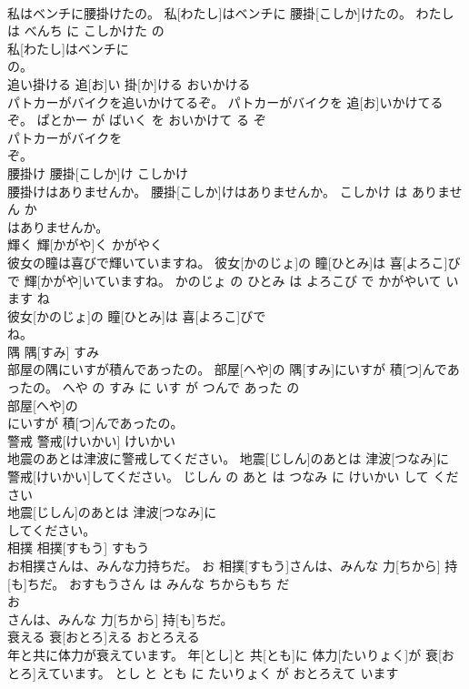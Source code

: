 \documentclass[8pt]{extreport}
\begin{document}
\begin{CJK}{UTF8}{min}
\\	私はベンチに腰掛けたの。	私[わたし]はベンチに 腰掛[こしか]けたの。	わたし は べんち に こしかけた の	
\\	私[わたし]はベンチに
\\	の。			
\\	追い掛ける	追[お]い 掛[か]ける	おいかける	
\\	パトカーがバイクを追いかけてるぞ。	パトカーがバイクを 追[お]いかけてるぞ。	ぱとかー が ばいく を おいかけて る ぞ	
\\	パトカーがバイクを
\\	ぞ。			
\\	腰掛け	腰掛[こしか]け	こしかけ	
\\	腰掛けはありませんか。	腰掛[こしか]けはありませんか。	こしかけ は ありません か	
\\	はありませんか。			
\\	輝く	輝[かがや]く	かがやく	
\\	彼女の瞳は喜びで輝いていますね。	彼女[かのじょ]の 瞳[ひとみ]は 喜[よろこ]びで 輝[かがや]いていますね。	かのじょ の ひとみ は よろこび で かがやいて います ね	
\\	彼女[かのじょ]の 瞳[ひとみ]は 喜[よろこ]びで
\\	ね。			
\\	隅	隅[すみ]	すみ	
\\	部屋の隅にいすが積んであったの。	部屋[へや]の 隅[すみ]にいすが 積[つ]んであったの。	へや の すみ に いす が つんで あった の	
\\	部屋[へや]の
\\	にいすが 積[つ]んであったの。			
\\	警戒	警戒[けいかい]	けいかい	
\\	地震のあとは津波に警戒してください。	地震[じしん]のあとは 津波[つなみ]に 警戒[けいかい]してください。	じしん の あと は つなみ に けいかい して ください	
\\	地震[じしん]のあとは 津波[つなみ]に
\\	してください。			
\\	相撲	相撲[すもう]	すもう	
\\	お相撲さんは、みんな力持ちだ。	お 相撲[すもう]さんは、みんな 力[ちから] 持[も]ちだ。	おすもうさん は みんな ちからもち だ	
\\	お
\\	さんは、みんな 力[ちから] 持[も]ちだ。			
\\	衰える	衰[おとろ]える	おとろえる	
\\	年と共に体力が衰えています。	年[とし]と 共[とも]に 体力[たいりょく]が 衰[おとろ]えています。	とし と とも に たいりょく が おとろえて います	

\end{CJK}
\end{document}
